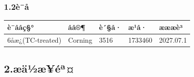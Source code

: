 \documentclass[UTF8,10pt,a4paper,fontset=fandol]{ctexart}
\newcommand{\fieldvalue}[1]{#1}
\newcommand{\handwritten}[1]{#1}
\begin{document}
\subsubsection*{1.2\quad è¯å}

\begin{tabularx}{\textwidth}{|X|X|X|X|X|}
\hline
è¯ååç§° & åå®¶ & è´§å· & æ¹å· & æææè³
\\ \hline
\fieldvalue{6å­æ¿(TC-treated)} &
\fieldvalue{Corning} &
\fieldvalue{3516} &
\fieldvalue{\handwritten{1733460}} &
\fieldvalue{\handwritten{2027.07.1}}
\\ \hline
\end{tabularx}

\subsection*{2.\quad æä½æ­¥éª¤}
\end{document}
